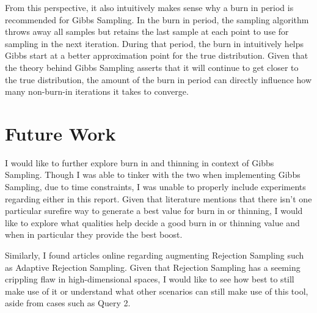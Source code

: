 \documentclass{article} %
\begin{document}
From this perspective, it also intuitively makes sense why a burn in period is recommended for Gibbs Sampling. In the burn in period, the sampling algorithm throws away all samples but retains the last sample at each point to use for sampling in the next iteration. During that period, the burn in intuitively helps Gibbs start at a better approximation point for the true distribution. Given that the theory behind Gibbs Sampling asserts that it will continue to get closer to the true distribution, the amount of the burn in period can directly influence how many non-burn-in iterations it takes to converge.

\section{Future Work}

I would like to further explore burn in and thinning in context of Gibbs Sampling. Though I was able to tinker with the two when implementing Gibbs Sampling, due to time constraints, I was unable to properly include experiments regarding either in this report. Given that literature mentions that there isn't one particular surefire way to generate a best value for burn in or thinning, I would like to explore what qualities help decide a good burn in or thinning value and when in particular they provide the best boost.

Similarly, I found articles online regarding augmenting Rejection Sampling such as Adaptive Rejection Sampling. Given that Rejection Sampling has a seeming crippling flaw in high-dimensional spaces, I would like to see how best to still make use of it or understand what other scenarios can still make use of this tool, aside from cases such as Query 2.
\end{document}
